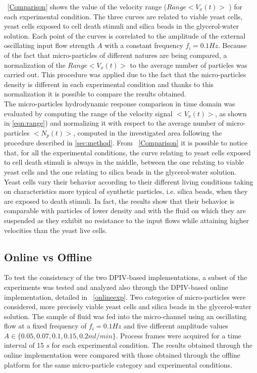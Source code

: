 \documentclass[journal]{IEEEtran}
\theoremstyle{definition}
\theoremstyle{remark}
\begin{document}
~\fig\ref{Comparison} shows the value of the velocity range ($Range<V_x(t)>$ ) for each experimental condition. The three curves are related to viable yeast cells, yeast cells exposed to cell death stimuli and silica beads in the glycerol-water solution. Each point of the curves is correlated to the amplitude of the external oscillating input flow strength $A$ with a constant frequency $f_i= 0.1 Hz$. 
Because of the fact that micro-particles of different natures are being compared, a normalization of the $Range<V_x(t)>$ to the average number of particles was carried out. This procedure was applied due to the fact that the micro-particles density is different in each experimental condition and thanks to this normalization it is possible to compare the results obtained. 
\\The micro-particles hydrodynamic response comparison in time domain was evaluated by computing the range of the velocity signal $<V_x(t)>$, as shown in \DS{\eqn(}\ref{eqn:range}) and normalizing it with respect to the average number of micro-particles $<N_p(t)>$, computed in the investigated area following the procedure described in \sect\ref{sec:method}.
From ~\fig\ref{Comparison} it is possible to notice that, for all the experimental conditions, the curve relating to yeast cells exposed to cell death stimuli is always in the middle, between the one relating to viable yeast cells and the one relating to silica beads in the glycerol-water solution.
Yeast cells vary their behavior according to their different living conditions taking on characteristics more typical of synthetic particles, i.e. silica beads, when they are exposed to death stimuli. In fact, the results show that their behavior is comparable with particles of lower density and with the fluid on which they are suspended as they exhibit no resistance to the input flows while attaining higher velocities than the yeast live cells.

\subsection{Online vs Offline}\label{sec:OnlineOffline}
To test the consistency of the two DPIV-based implementations, a subset of the experiments was tested and analyzed also through the DPIV-based online implementation, detailed in ~\tab\ref{onlineexp}. Two categories of micro-particles were considered, more precisely viable yeast cells and silica beads in the glycerol-water solution. The sample of fluid was fed into the micro-channel using an oscillating flow at a fixed frequency of $f_i= 0.1 Hz$ and five different amplitude values $A \in \{ 0.05, 0.07, 0.1, 0.15, 0.2 ml/min \}$. Process frames were acquired for a time interval of 15 $s$ for each experimental condition. 
The results obtained through the online implementation were compared with those obtained through the offline platform for the same micro-particle category and experimental conditions. 
\end{document}
